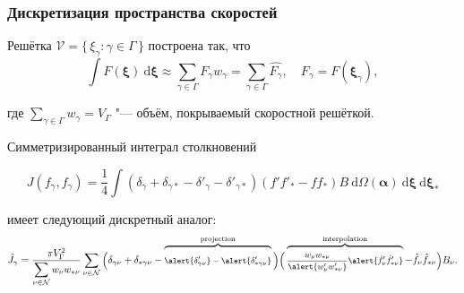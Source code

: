 \documentclass[mathserif]{beamer} %
\newcommand{\dd}{\:\mathrm{d}}
\newcommand{\dxi}{\boldsymbol{\dd\xi}}
\newcommand{\bxi}{\boldsymbol{\xi}}
\newcommand{\Nu}{\mathcal{N}}
\newcommand{\Set}[2]{\{\,{#1}:{#2}\,\}}
\newcommand{\xoverbrace}[2][\vphantom{\int}]{\overbrace{#1#2}}
\begin{document}
\begin{frame}
    \frametitle{Дискретизация пространства скоростей}
    Решётка \(\mathcal{V} = \Set{\xi_\gamma}{\gamma\in\Gamma}\) построена так, что
    \begin{equation}\label{eq:xi_cubature}
        \int F(\bxi) \dxi \approx \sum_{\gamma\in\Gamma} F_\gamma w_\gamma =
            \sum_{\gamma\in\Gamma} \hat{F_\gamma},
            \quad F_\gamma = F(\bxi_\gamma),
    \end{equation}\vspace{-10pt}

    где \(\sum_{\gamma\in\Gamma} w_\gamma = V_\Gamma\) "--- объём, покрываемый скоростной решёткой.
    \pause\vspace{10pt}

    Симметризированный интеграл столкновений\vspace{-20pt}

    \begin{equation}\label{eq:symm_ci}
        J(f_\gamma, f_\gamma) = \frac14\int \left(
            \delta_\gamma + \delta_{\gamma*} - \delta'_\gamma - \delta'_{\gamma*}
        \right) (f'f'_* - ff_*)B \dd\Omega(\boldsymbol{\alpha}) \dxi\dxi_*
    \end{equation}\vspace{-30pt}

    имеет следующий дискретный аналог:
    \begin{equation}\label{eq:discrete_symm_ci}
        \footnotesize
        \hat{J}_\gamma = \frac{\pi V_\Gamma^2}{\displaystyle\sum_{\nu\in\Nu} w_{\nu}w_{*\nu}}
            \sum_{\nu\in\Nu} \bigg(
                \delta_{\gamma\nu} + \delta_{*\gamma\nu} -
                \xoverbrace{ \alert{\delta'_{\gamma\nu}} - \alert{\delta'_{*\gamma\nu}} }^\text{projection}
            \bigg)\bigg(
                \xoverbrace{ \frac{w_{\nu}w_{*\nu}}{\alert{w'_{\nu}w'_{*\nu}}}
                \alert{\hat{f}'_{\nu}\hat{f}'_{*\nu}} }^\text{interpolation} - \hat{f}_{\nu}\hat{f}_{*\nu}
            \bigg)B_\nu.
    \end{equation}\vspace{-10pt}
\end{frame}
\end{document}
